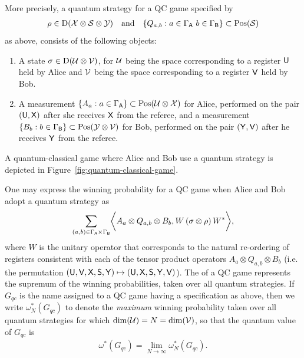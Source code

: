 More precisely, a quantum strategy for a QC game specified by 
\begin{align}
	\rho \in \mathrm{D}(\mathcal{X} \otimes \mathcal{S} \otimes \mathcal{Y})	\quad \textnormal{and} \quad \{Q_{a,b} : a \in \Gamma_{\mathsf{A}} \ b \in \Gamma_{\mathsf{B}} \} \subset \mathrm{Pos}(\mathcal{S})
\end{align}
as above, consists of the following objects:
\begin{enumerate}
	\item A state $\sigma \in \mathrm{D}(\mathcal{U} \otimes \mathcal{V})$, for $\mathcal{U}$ being the space corresponding to a register $\mathsf{U}$ held by Alice and $\mathcal{V}$ being the space corresponding to a register $\mathsf{V}$ held by Bob. 
	\item A measurement $\{A_a : a \in \Gamma_{\mathsf{A}}\} \subset \mathrm{Pos}(\mathcal{U} \otimes \mathcal{X})$ for Alice, performed on the pair $(\mathsf{U},\mathsf{X})$ after she receives $\mathsf{X}$ from the referee, and a measurement $\{ B_b : b \in \Gamma_{\mathsf{B}} \} \subset \mathrm{Pos}(\mathcal{Y} \otimes \mathcal{V})$ for Bob, performed on the pair $(\mathsf{Y},\mathsf{V})$ after he receives $\mathsf{Y}$ from the referee. 
\end{enumerate}
A quantum-classical game where Alice and Bob use a quantum strategy is depicted in Figure~\ref{fig:quantum-classical-game}. 

One may express the winning probability for a QC game when Alice and Bob adopt a quantum strategy as 
\begin{align}
	\sum_{(a,b) \in \Gamma_{\mathsf{A}} \times \Gamma_{\mathsf{B}}} \biggl\langle  A_a \otimes Q_{a,b} \otimes B_b , W \left( \sigma \otimes \rho \right) W^* \biggr\rangle,
\end{align}
where $W$ is the unitary operator that corresponds to the natural re-ordering of registers consistent with each of the tensor product operators $A_a \otimes Q_{a,b} \otimes B_b$ (i.e. the permutation $( \mathsf{U}, \mathsf{V}, \mathsf{X}, \mathsf{S}, \mathsf{Y} ) \mapsto ( \mathsf{U}, \mathsf{X}, \mathsf{S}, \mathsf{Y}, \mathsf{V} )$).
The  of a QC game represents the supremum of the winning probabilities, taken over all quantum strategies. If $G_{qc}$ is the name assigned to a QC game having a specification as above, then we write $\omega^*_N(G_{qc})$ to denote the \emph{maximum} winning probability taken over all quantum strategies for which $\dim(\mathcal{U}) = N = \dim(\mathcal{V})$, so that the quantum value of $G_{qc}$ is 
\begin{align}
	\omega^*(G_{qc}) = \lim_{N \rightarrow \infty} \omega_N^*(G_{qc}).
\end{align}

